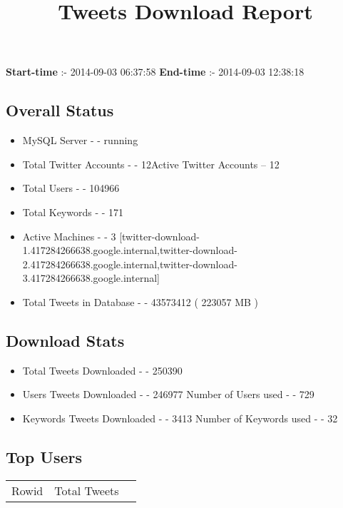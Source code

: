 \documentclass{article}\usepackage[T1]{fontenc}
\begin{document}
\title{\textbf{Tweets Download Report}}
               \date{}
                \maketitle
               \centerline{\textbf{Start-time} :- 2014-09-03 06:37:58 \hspace{40pt} \textbf{End-time} :- 2014-09-03 12:38:18}               \subsection*{Overall Status}                \begin{itemize}                \item MySQL Server - - running               \item Total Twitter Accounts - - 12\newline Active Twitter Accounts -- 12               \item Total Users - - 104966               \item Total Keywords - - 171               \item Active Machines - - 3 [twitter-download-1.417284266638.google.internal,twitter-download-2.417284266638.google.internal,twitter-download-3.417284266638.google.internal]               \item Total Tweets in Database - - 43573412 ( 223057 MB )               \end{itemize}               \subsection*{Download Stats}                \begin{itemize}                \item Total Tweets Downloaded - - 250390               \item Users Tweets Downloaded - - 246977 \newline Number of Users used - - 729               \item Keywords Tweets Downloaded - - 3413 \newline Number of Keywords used - - 32              \end{itemize}              \subsection*{Top Users}\begin{tabular}{|c|c|c|}         \hline         Rowid & Total Tweets \\ 

\end{tabular}
\end{document}
